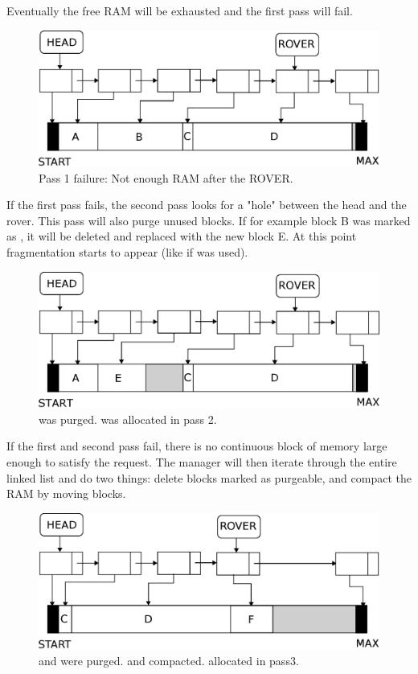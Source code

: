 \documentclass[book.tex]{subfiles}
\begin{document}
 \par
Eventually the free RAM will be exhausted and the first pass will fail.
  \par
\begin{figure}[H]
\centering
 \includegraphics[width=\textwidth]{imgs/drawings/mm_before_rover.eps}
 \caption{Pass 1 failure: Not enough RAM after the ROVER.}
 \end{figure}
 \par
 If the first pass fails, the second pass looks for a "hole" between the head and the rover. This pass will also purge unused blocks. If for example block B was marked as , it will be deleted and replaced with the new block E. At this point fragmentation starts to appear (like if  was used).\\
 \begin{figure}[H]
\centering
 \includegraphics[width=\textwidth]{imgs/drawings/mm_after_head.eps}
 \caption{ was purged.  was allocated in pass 2.}
 \end{figure}
 \par
 If the first and second pass fail, there is no continuous block of memory large enough to satisfy the request. The manager will then iterate through the entire linked list and do two things: delete blocks marked as purgeable, and compact the RAM by moving blocks.
  \par
\begin{figure}[H]
\centering
 \includegraphics[width=\textwidth]{imgs/drawings/mm_compact.eps}
  \caption{ and  were purged.  and  compacted.  allocated in pass3.}
 \end{figure}
\end{document}
